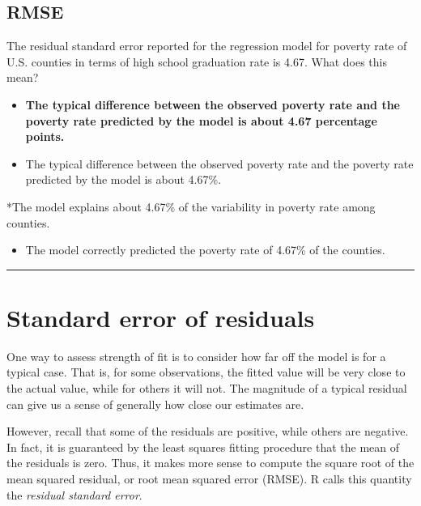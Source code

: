 \documentclass[
]{book}
\providecommand{\tightlist}{%
  \setlength{\itemsep}{0pt}\setlength{\parskip}{0pt}}
\begin{document}
\hypertarget{rmse}{%
\subsection*{RMSE}\label{rmse}}

The residual standard error reported for the regression model for poverty rate of U.S. counties in terms of high school graduation rate is 4.67. What does this mean?

\begin{itemize}
\item
  \textbf{The typical difference between the observed poverty rate and the poverty rate predicted by the model is about 4.67 percentage points.}
\item
  The typical difference between the observed poverty rate and the poverty rate predicted by the model is about 4.67\%.
\end{itemize}

*The model explains about 4.67\% of the variability in poverty rate among counties.

\begin{itemize}
\tightlist
\item
  The model correctly predicted the poverty rate of 4.67\% of the counties.
\end{itemize}

\begin{center}\rule{0.5\linewidth}{0.5pt}\end{center}

\hypertarget{standard-error-of-residuals}{%
\section{Standard error of residuals}\label{standard-error-of-residuals}}

One way to assess strength of fit is to consider how far off the model is for a typical case. That is, for some observations, the fitted value will be very close to the actual value, while for others it will not. The magnitude of a typical residual can give us a sense of generally how close our estimates are.

However, recall that some of the residuals are positive, while others are negative. In fact, it is guaranteed by the least squares fitting procedure that the mean of the residuals is zero. Thus, it makes more sense to compute the square root of the mean squared residual, or root mean squared error (RMSE). R calls this quantity the \emph{residual standard error}.
\end{document}
